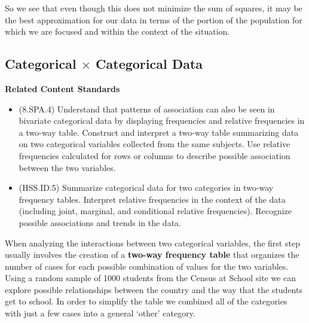 \documentclass[
]{book}
\providecommand{\tightlist}{%
  \setlength{\itemsep}{0pt}\setlength{\parskip}{0pt}}
\newenvironment{standards}{}{}
\theoremstyle{definition}
\theoremstyle{definition}
\theoremstyle{definition}
\theoremstyle{definition}
\theoremstyle{remark}
\begin{document}
So we see that even though this does not minimize the sum of squares, it may be the best approximation for our data in terms of the portion of the population for which we are focused and within the context of the situation.

\hypertarget{categorical-times-categorical-data}{%
\subsection{\texorpdfstring{Categorical \(\times\) Categorical Data}{Categorical \textbackslash times Categorical Data}}\label{categorical-times-categorical-data}}

\begin{standards}

\begin{center}
\textbf{Related Content Standards}

\end{center}

\begin{itemize}
\tightlist
\item
  (8.SPA.4) Understand that patterns of association can also be seen in bivariate categorical data by displaying frequencies and relative frequencies in a two-way table. Construct and interpret a two-way table summarizing data on two categorical variables collected from the same subjects. Use relative frequencies calculated for rows or columns to describe possible association between the two variables.
\item
  (HSS.ID.5) Summarize categorical data for two categories in two-way frequency tables. Interpret relative frequencies in the context of the data (including joint, marginal, and conditional relative frequencies). Recognize possible associations and trends in the data.
\end{itemize}

\end{standards}

When analyzing the interactions between two categorical variables, the first step usually involves the creation of a \textbf{two-way frequency table} that organizes the number of cases for each possible combination of values for the two variables. Using a random sample of 1000 students from the Census at School site we can explore possible relationships between the country and the way that the students get to school. In order to simplify the table we combined all of the categories with just a few cases into a general `other' category.
\end{document}
